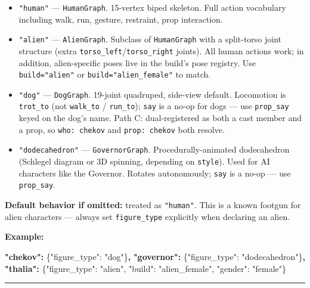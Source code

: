 \documentclass[
  11pt,
]{book}
\newenvironment{Shaded}{}{}
\newcommand{\DataTypeTok}[1]{\textcolor[rgb]{0.56,0.13,0.00}{#1}}
\newcommand{\ErrorTok}[1]{\textcolor[rgb]{1.00,0.00,0.00}{\textbf{#1}}}
\newcommand{\FunctionTok}[1]{\textcolor[rgb]{0.02,0.16,0.49}{#1}}
\newcommand{\StringTok}[1]{\textcolor[rgb]{0.25,0.44,0.63}{#1}}
\providecommand{\tightlist}{%
  \setlength{\itemsep}{0pt}\setlength{\parskip}{0pt}}
\begin{document}
\begin{itemize}
\tightlist
\item
  \texttt{"human"} --- \texttt{HumanGraph}. 15-vertex biped skeleton.
  Full action vocabulary including walk, run, gesture, restraint, prop
  interaction.
\item
  \texttt{"alien"} --- \texttt{AlienGraph}. Subclass of
  \texttt{HumanGraph} with a split-torso joint structure (extra
  \texttt{torso\_left}/\texttt{torso\_right} joints). All human actions
  work; in addition, alien-specific poses live in the build's pose
  registry. Use \texttt{build="alien"} or \texttt{build="alien\_female"}
  to match.
\item
  \texttt{"dog"} --- \texttt{DogGraph}. 19-joint quadruped, side-view
  default. Locomotion is \texttt{trot\_to} (not \texttt{walk\_to} /
  \texttt{run\_to}); \texttt{say} is a no-op for dogs --- use
  \texttt{prop\_say} keyed on the dog's name. Path C: dual-registered as
  both a cast member and a prop, so \texttt{who:\ chekov} and
  \texttt{prop:\ chekov} both resolve.
\item
  \texttt{"dodecahedron"} --- \texttt{GovernorGraph}.
  Procedurally-animated dodecahedron (Schlegel diagram or 3D spinning,
  depending on \texttt{style}). Used for AI characters like the
  Governor. Rotates autonomously; \texttt{say} is a no-op --- use
  \texttt{prop\_say}.
\end{itemize}

\textbf{Default behavior if omitted:} treated as \texttt{"human"}. This
is a known footgun for alien characters --- always set
\texttt{figure\_type} explicitly when declaring an alien.

\textbf{Example:}

\begin{Shaded}
\begin{Highlighting}[]
\ErrorTok{"chekov":}   \FunctionTok{\{}\DataTypeTok{"figure\_type"}\FunctionTok{:} \StringTok{"dog"}\FunctionTok{\}}\ErrorTok{,}
\ErrorTok{"governor":} \FunctionTok{\{}\DataTypeTok{"figure\_type"}\FunctionTok{:} \StringTok{"dodecahedron"}\FunctionTok{\}}\ErrorTok{,}
\ErrorTok{"thalia":}   \FunctionTok{\{}\DataTypeTok{"figure\_type"}\FunctionTok{:} \StringTok{"alien"}\FunctionTok{,} \DataTypeTok{"build"}\FunctionTok{:} \StringTok{"alien\_female"}\FunctionTok{,} \DataTypeTok{"gender"}\FunctionTok{:} \StringTok{"female"}\FunctionTok{\}}
\end{Highlighting}
\end{Shaded}

\begin{center}\rule{0.5\linewidth}{0.5pt}\end{center}
\end{document}
